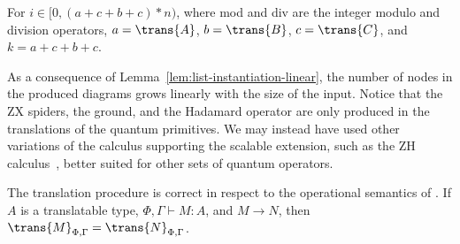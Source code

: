 For $i \in [0,(a+c+b+c)*n)$,
where mod and div are the integer modulo and division operators,
$a = \trans{A}$, $b = \trans{B}$, $c = \trans{C}$,
and $k = a+c+b+c$.

As a consequence of Lemma~\ref{lem:list-instantiation-linear},
the number of nodes in the produced diagrams grows linearly
with the size of the input.
Notice that the ZX spiders, the ground, and the Hadamard operator
are only produced in the translations of the quantum primitives.
We may instead have used other variations of the calculus
supporting the scalable extension, such as the ZH calculus~\cite{Backens_2019},
better suited for other sets of quantum operators.

\begin{lemma}%
    \label{lem:trans-reduction}
    The translation procedure is correct in respect to the operational semantics of \lambdaD.
    If $A$ is a translatable type, $\Phi, \Gamma \vdash M : A$, and $M \to N$,
    then $\trans{M}_{\Phi,\Gamma} = \trans{N}_{\Phi,\Gamma}$.
\end{lemma}